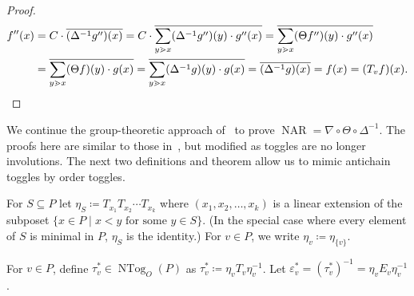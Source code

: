 \documentclass[ALCO,ThmDefs,Unicode,epreuves]{cedram}
\newcommand{\e}{\varepsilon}
\newcommand{\down}{\nabla}
\newcommand{\up}{\Delta}
\DeclareMathOperator{\ntog}{NTog}
\DeclareMathOperator{\NAR}{NAR}
\begin{document}
\begin{proof}
\begin{align*}
f''(x) &=
C\cdot \overline{(\up^{-1}g'')(x)}
=
C\cdot \overline{\sum\limits_{y\gtrdot x}(\up^{-1}g'')(y)
\cdot g''(x)}
=
\overline{\sum\limits_{y\gtrdot x}(\Theta f'')(y)
\cdot g''(x)}\\
&=
\overline{\sum\limits_{y\gtrdot x}(\Theta f)(y)
\cdot g(x)}
=
\overline{\sum\limits_{y\gtrdot x}(\up^{-1}g)(y)
\cdot g(x)}
=
\overline{(\up^{-1}g)(x)}
=f(x)
=(T_v f)(x).\qedhere
\end{align*}
\end{proof}

We continue the group-theoretic approach of~\cite{antichain-toggling} to prove
$\NAR=\down\circ\Theta\circ\up^{-1}$.
The proofs here are similar to those
in~\cite{antichain-toggling}, but modified as
toggles are no longer involutions. The next two definitions and theorem allow us to mimic antichain toggles by order toggles. 

\begin{defi}
For $S\subseteq P$ let $\eta_S\coloneqq T_{x_1}T_{x_2}\cdots T_{x_k}$
where $(x_1,x_2,\dots,x_k)$ is a linear extension of the subposet 
$\{x\in P\;|\;x<y \text{ for some }y\in S\}$. (In the special case where every element of $S$ is minimal in $P$,
$\eta_S$ is the identity.) For $v\in P$, we write $\eta_v\coloneqq \eta_{\{v\}}$. 
\end{defi}

\begin{defi}
For $v\in P$, define $\tau_v^*\in\ntog_O(P)$ as $\tau_v^* \coloneqq \eta_v T_v \eta_v^{-1}$. Let $\e_v^*=\left(\tau_v^*\right)^{-1} = \eta_v E_v \eta_v^{-1}$.
\end{defi}
\end{document}
